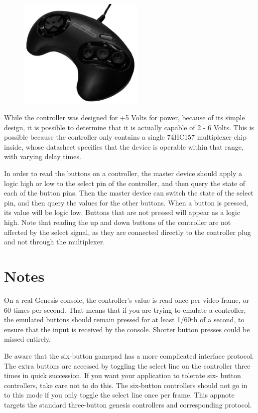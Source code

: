 \documentclass{capstonedoc}
\begin{document}
\begin{figure}[t]
  \centering
  \includegraphics[width=6cm]{genesis_controller}
\end{figure}

While the controller was designed for +5 Volts for power, because of its simple
design, it is possible to determine that it is actually capable of 2 - 6 Volts.
This is possible because the controller only contains a single 74HC157
multiplexer chip inside, whose datasheet specifies that the device is operable
within that range, with varying delay times.\cite{TC74HC157AP}

In order to read the buttons on a controller, the master device should apply
a logic high or low to the select pin of the controller, and then query the
state of each of the button pins. Then the master device can switch the state
of the select pin, and then query the values for the other buttons. When a
button is pressed, its value will be logic low. Buttons that are not pressed
will appear as a logic high. Note that reading the up and down buttons of
the controller are not affected by the select signal, as they are connected
directly to the controller plug and not through the multiplexer.

\section{Notes}
On a real Genesis console, the controller's value is read once per video frame,
or 60 times per second. That means that if you are trying to emulate a
controller, the emulated buttons should remain pressed for at least 1/60th of
a second, to ensure that the input is received by the console. Shorter button
presses could be missed entirely.

Be aware that the six-button gamepad has a more complicated interface protocol.
The extra buttons are accessed by toggling the select line on the controller
three times in quick succession. If you want your application to tolerate six-
button controllers, take care not to do this. The six-button controllers should
not go in to this mode if you only toggle the select line once per frame.
This appnote targets the standard three-button genesis controllers and 
corresponding protocol.
\end{document}
